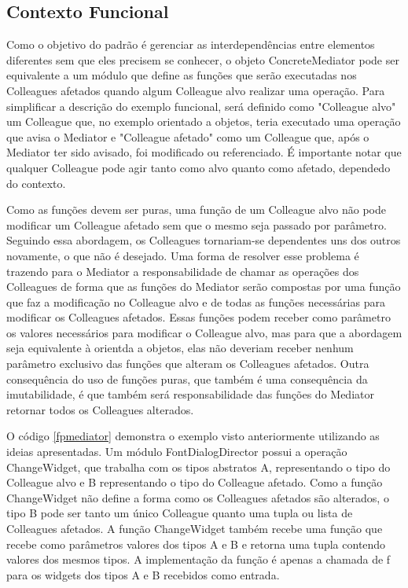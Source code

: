\subsection*{Contexto Funcional}

Como o objetivo do padrão é gerenciar as interdependências 
entre elementos diferentes sem que eles precisem se conhecer, 
o objeto ConcreteMediator pode ser equivalente a um módulo 
que define as funções que serão executadas nos Colleagues 
afetados quando algum Colleague alvo realizar uma operação. 
Para simplificar a descrição do exemplo funcional, será 
definido como "Colleague alvo" um Colleague que, no 
exemplo orientado a objetos, teria executado uma operação 
que avisa o Mediator e "Colleague afetado" como um 
Colleague que, após o Mediator ter sido avisado, foi 
modificado ou referenciado. É importante notar que qualquer 
Colleague pode agir tanto como alvo quanto como afetado, 
dependedo do contexto.

Como as funções devem ser puras, uma função de um Colleague 
alvo não pode modificar um Colleague afetado sem que o mesmo seja 
passado por parâmetro. Seguindo essa abordagem, os Colleagues 
tornariam-se dependentes uns dos outros novamente, o que não 
é desejado. Uma forma de resolver esse problema é trazendo 
para o Mediator a responsabilidade de chamar as operações 
dos Colleagues de forma que as funções do Mediator serão 
compostas por uma função que faz a modificação no Colleague alvo  
e de todas as funções necessárias para modificar os 
Colleagues afetados. Essas funções podem receber como parâmetro 
os valores necessários para modificar o Colleague alvo, 
mas para que a abordagem seja equivalente à orientda a 
objetos, elas não deveriam receber nenhum parâmetro 
exclusivo das funções que alteram os Colleagues afetados. 
Outra consequência do uso de funções puras, que também 
é uma consequência da imutabilidade, é que também será 
responsabilidade das funções do Mediator retornar todos 
os Colleagues alterados.

O código \ref{fpmediator} demonstra o exemplo visto 
anteriormente utilizando as ideias apresentadas. Um módulo 
FontDialogDirector possui a operação ChangeWidget, que 
trabalha com os tipos abstratos A, representando o tipo 
do Colleague alvo e B representando o tipo do Colleague 
afetado. Como a função ChangeWidget não define a forma 
como os Colleagues afetados são alterados, o tipo B pode 
ser tanto um único Colleague quanto uma tupla ou lista 
de Colleagues afetados. A função ChangeWidget também 
recebe uma função que recebe como parâmetros valores 
dos tipos A e B e retorna uma tupla contendo valores 
dos mesmos tipos. A implementação da função é apenas a chamada 
de f para os widgets dos tipos A e B recebidos como entrada.

